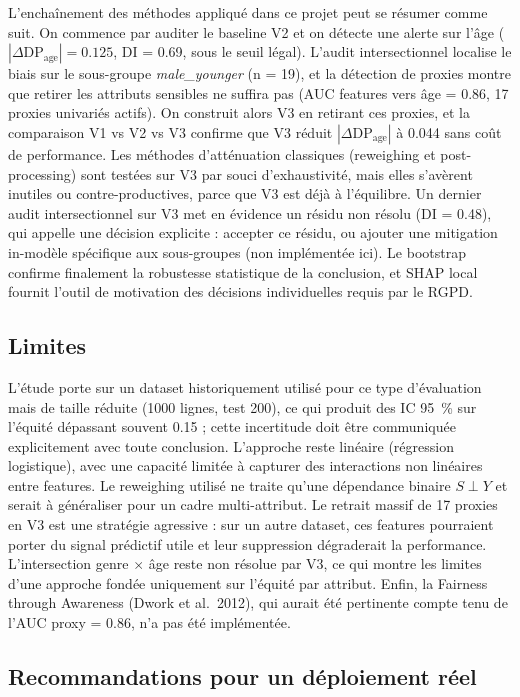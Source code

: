\documentclass[11pt, a4paper]{article}
\begin{document}
L'enchaînement des méthodes appliqué dans ce projet peut se résumer comme suit. On commence par auditer le baseline V2 et on détecte une alerte sur l'âge ($|\Delta\text{DP}_{\text{age}}| = 0.125$, DI = 0.69, sous le seuil légal). L'audit intersectionnel localise le biais sur le sous-groupe \emph{male\_younger} (n = 19), et la détection de proxies montre que retirer les attributs sensibles ne suffira pas (AUC features vers âge = 0.86, 17 proxies univariés actifs). On construit alors V3 en retirant ces proxies, et la comparaison V1 vs V2 vs V3 confirme que V3 réduit $|\Delta\text{DP}_{\text{age}}|$ à 0.044 sans coût de performance. Les méthodes d'atténuation classiques (reweighing et post-processing) sont testées sur V3 par souci d'exhaustivité, mais elles s'avèrent inutiles ou contre-productives, parce que V3 est déjà à l'équilibre. Un dernier audit intersectionnel sur V3 met en évidence un résidu non résolu (DI = 0.48), qui appelle une décision explicite : accepter ce résidu, ou ajouter une mitigation in-modèle spécifique aux sous-groupes (non implémentée ici). Le bootstrap confirme finalement la robustesse statistique de la conclusion, et SHAP local fournit l'outil de motivation des décisions individuelles requis par le RGPD.

\subsection{Limites}

L'étude porte sur un dataset historiquement utilisé pour ce type d'évaluation mais de taille réduite (1000 lignes, test 200), ce qui produit des IC 95~\% sur l'équité dépassant souvent 0.15 ; cette incertitude doit être communiquée explicitement avec toute conclusion. L'approche reste linéaire (régression logistique), avec une capacité limitée à capturer des interactions non linéaires entre features. Le reweighing utilisé ne traite qu'une dépendance binaire $S \perp Y$ et serait à généraliser pour un cadre multi-attribut. Le retrait massif de 17 proxies en V3 est une stratégie agressive : sur un autre dataset, ces features pourraient porter du signal prédictif utile et leur suppression dégraderait la performance. L'intersection genre $\times$ âge reste non résolue par V3, ce qui montre les limites d'une approche fondée uniquement sur l'équité par attribut. Enfin, la Fairness through Awareness (Dwork et al.\ 2012), qui aurait été pertinente compte tenu de l'AUC proxy = 0.86, n'a pas été implémentée.

\subsection{Recommandations pour un déploiement réel}
\end{document}
